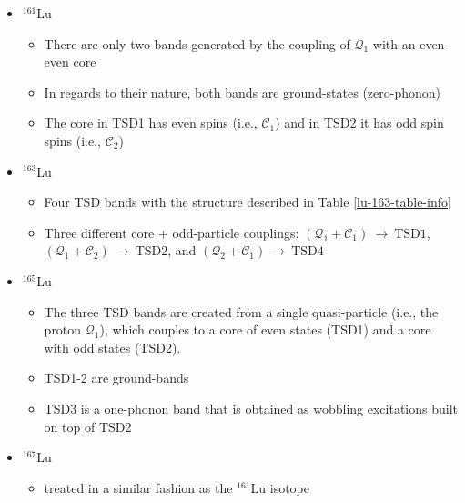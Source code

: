 \begin{itemize}
    \item $^{161}$Lu
    \begin{itemize}
        \item There are only two bands generated by the coupling of $\mathcal{Q}_1$ with an even-even core
        \item In regards to their nature, both bands are ground-states (zero-phonon)
        \item The core in TSD1 has even spins (i.e., $\mathscr{C}_1$) and in TSD2 it has odd spin spins (i.e., $\mathscr{C}_2$)
    \end{itemize}
    \item $^{163}$Lu
    \begin{itemize}
        \item Four TSD bands with the structure described in Table \ref{lu-163-table-info}
        \item Three different core + odd-particle couplings: $(\mathcal{Q}_1+\mathscr{C}_1)\ \to\ \text{TSD1}$, $(\mathcal{Q}_1+\mathscr{C}_2)\ \to\ \text{TSD2}$, and $(\mathcal{Q}_2+\mathscr{C}_1)\ \to\ \text{TSD4}$
    \end{itemize}
    \item $^{165}$Lu
    \begin{itemize}
        \item The three TSD bands are created from a single quasi-particle (i.e., the proton $\mathcal{Q}_1$), which couples to a core of even states (TSD1) and a core with odd states (TSD2).
        \item TSD1-2 are ground-bands
        \item TSD3 is a one-phonon band that is obtained as wobbling excitations built on top of TSD2
    \end{itemize}
    \item $^{167}$Lu
    \begin{itemize}
        \item treated in a similar fashion as the $^{161}$Lu isotope
    \end{itemize}
\end{itemize}

